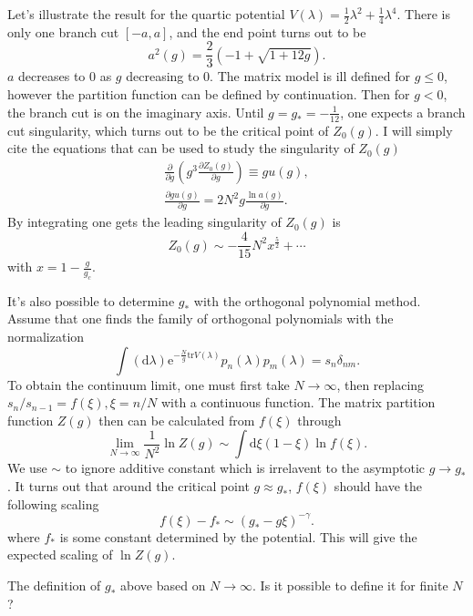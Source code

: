 Let's illustrate the result for the quartic potential $V(\lambda)=\frac{1}{2}\lambda^2+\frac{1}{4}\lambda^4$.
There is only one branch cut $[-a,a]$, and the end point turns out to be \[
	a^2(g) = \frac{2}{3}(-1+\sqrt{1+12 g})
.\] 
$a$ decreases to $0$ as $g$ decreasing to $0$.
The matrix model is ill defined for $g\leq 0$,
however the partition function can be defined by continuation.
Then for $g<0$, the branch cut is on the imaginary axis.
Until $g=g_*=-\frac{1}{12}$, one expects a branch cut singularity,
which turns out to be the critical point of $Z_0(g)$.
I will simply cite the equations that can be used to study the singularity of $Z_0(g)$
\begin{align}
	\frac{\partial}{\partial g} \left(g^3 \frac{\partial Z_0(g)}{\partial g}\right) \equiv g u(g),\\
	\frac{\partial gu(g)}{\partial g} = 2 N^2 g \frac{\ln a(g)}{\partial g}.
\end{align}
By integrating one gets the leading singularity of $Z_0(g)$ is
\begin{equation}
	Z_0(g) \sim - \frac{4}{15} N^2 x^{\frac{5}{2}} + \cdots
\end{equation}
with $x=1 - \frac{g}{g_c}$.

It's also possible to determine $g_*$ with the orthogonal polynomial method.
Assume that one finds the family of orthogonal polynomials with the normalization
\begin{equation}
	\int (\mathrm{d}\lambda) \mathrm{e}^{-\frac{N}{g}\mathrm{tr}V(\lambda)}p_n(\lambda) p_m(\lambda) = s_n \delta_{nm}
.\end{equation}
To obtain the continuum limit, one must first take $N\to\infty$,
then replacing $s_n/s_{n-1}=f(\xi),\xi=n/N$ with a continuous function.
The matrix partition function $Z(g)$ then can be calculated from $f(\xi)$ through
\begin{equation}
	\lim_{N\to\infty} \frac{1}{N^2} \ln Z(g) \sim \int \mathrm{d}\xi (1-\xi) \ln f(\xi)
.\end{equation}
We use $\sim$ to ignore additive constant which is irrelavent to the asymptotic $g\to g_*$.
It turns out that around the critical point $g\approx g_*$,
$f(\xi)$ should have the following scaling
\begin{equation}
	f(\xi) - f_* \sim (g_* - g\xi)^{-\gamma}
.\end{equation}
where $f_*$ is some constant determined by the potential.
This will give the expected scaling of $\ln Z(g)$.

The definition of $g_*$ above based on $N\to\infty$.
Is it possible to define it for finite $N$?

